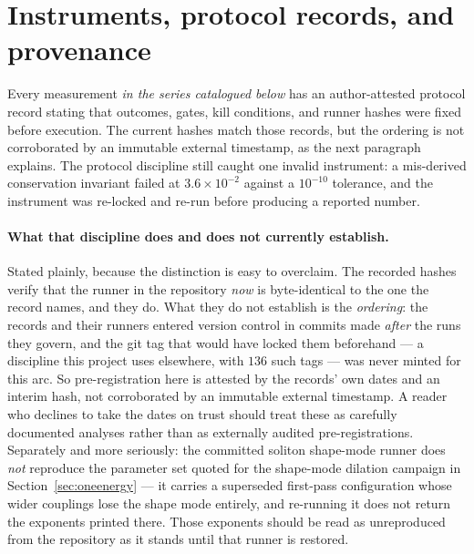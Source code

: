 \documentclass[11pt,a4paper]{article}
\theoremstyle{definition}
\theoremstyle{plain}
\theoremstyle{remark}
\begin{document}
\appendix
\section{Instruments, protocol records, and provenance}
\label{app:instruments}

Every measurement \emph{in the series catalogued below} has an
author-attested protocol record stating that outcomes, gates, kill
conditions, and runner hashes were fixed before execution. The current
hashes match those records, but the ordering is not corroborated by an
immutable external timestamp, as the next paragraph explains. The protocol
discipline still caught one invalid instrument: a mis-derived conservation
invariant failed at $3.6\times10^{-2}$ against a $10^{-10}$ tolerance, and
the instrument was re-locked and re-run before producing a reported number.

\paragraph{What that discipline does and does not currently establish.}
Stated plainly, because the distinction is easy to overclaim. The
recorded hashes verify that the runner in the repository \emph{now} is
byte-identical to the one the record names, and they do. What they do not
establish is the \emph{ordering}: the records and their runners entered
version control in commits made \emph{after} the runs they govern, and
the git tag that would have locked them beforehand --- a discipline this
project uses elsewhere, with $136$ such tags --- was never minted for
this arc. So pre-registration here is attested by the records' own dates
and an interim hash, not corroborated by an immutable external timestamp.
A reader who declines to take the dates on trust should treat these as
carefully documented analyses rather than as externally audited
pre-registrations. Separately and more seriously: the committed soliton
shape-mode runner does \emph{not} reproduce the parameter set quoted for
the shape-mode dilation campaign in Section~\ref{sec:oneenergy} --- it carries a superseded
first-pass configuration whose wider couplings lose the shape mode
entirely, and re-running it does not return the exponents printed there.
Those exponents should be read as unreproduced from the repository as it
stands until that runner is restored.
\end{document}
